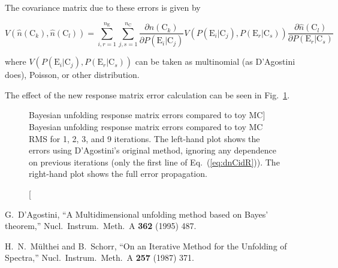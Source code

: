 \documentclass[12pt,a4paper]{article}
\newcommand{\E}{\mathrm{E}}
\newcommand{\C}{\mathrm{C}}
\newcommand{\dd}[2]{\frac{\partial{#1}}{\partial{#2}}}
\begin{document}
The covariance matrix due to these errors is given by

\begin{equation}
V(\hat{n}(\C_k),\hat{n}(\C_l)) = \sum_{i,r=1}^{n_{\E}} \sum_{j,s=1}^{n_{\C}} \dd{\hat{n}(\C_k)}{P(\E_i|\C_j)} V(P(\E_i|\C_j),P(\E_r|\C_s)) \dd{\hat{n}(\C_l)}{P(\E_r|\C_s)}
\end{equation}

where $V(P(\E_i|\C_j),P(\E_r|\C_s))$ can be taken as multinomial (as D'Agostini does), Poisson, or other distribution.

The effect of the new response matrix error calculation can be seen in Fig.~\ref{fig:bayes_errors_sys}.%
\begin{figure}[ht]
%
\caption
[Bayesian unfolding response matrix errors compared to toy MC]%
{Bayesian unfolding response matrix errors compared to toy MC RMS for 1, 2, 3, and 9 iterations.
The left-hand plot shows the errors using D'Agostini's original method,
ignoring any dependence on previous iterations (only the first line of Eq.~(\ref{eq:dnCidR})).
The right-hand plot shows the full error propagation.}%
\label{fig:bayes_errors_sys}%
\end{figure}


\begin{thebibliography}{99}

  G.~D'Agostini,
  ``A Multidimensional unfolding method based on Bayes' theorem,''
  Nucl.\ Instrum.\ Meth.\  A {\bf 362} (1995) 487.

  H.~N.~M\"ulthei and B.~Schorr,
  ``On an Iterative Method for the Unfolding of Spectra,''
  Nucl.\ Instrum.\ Meth.\  A {\bf 257} (1987) 371.

\end{thebibliography}
\end{document}
